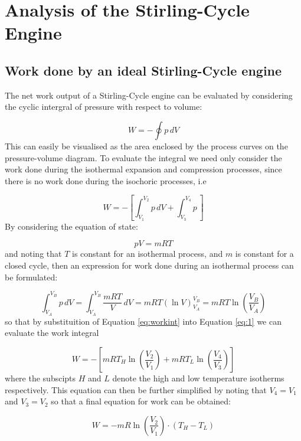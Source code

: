 \documentclass[a4paper,12pt]{article}
\date{13-10-2020}
\begin{document}
\section{Analysis of the Stirling-Cycle Engine}
\subsection{Work done by an ideal Stirling-Cycle engine}
The net work output of a Stirling-Cycle engine can be evaluated by considering the cyclic intergral of pressure with respect to volume:

\begin{equation}
    W = -\oint p \, dV
\end{equation}
This can easily be visualised as the area enclosed by the process curves on the pressure-volume diagram. \newline
To evaluate the integral we need only consider the work done during the isothermal expansion and compression processes, since there is no work done during the isochoric processes, i.e

\begin{equation}
    W = - \left[ \int_{V_1}^{V_2} p \, dV + \int_{V_3}^{V_4} p \,\right]
    \label{eq:1}
\end{equation}
By considering the equation of state:

\begin{equation}
    pV=mRT
\end{equation}
and noting that \(T\) is constant for an isothermal process, and \(m\) is constant for a closed cycle, then an expression for work done during an isothermal process can be formulated:

\begin{equation}
    \int_{V_A}^{V_B} p \, dV = \int_{V_A}^{V_B} \frac{mRT}{V} \, dV = mRT(\ln V)_{V_A}^{V_B} = mRT \ln\left(\frac{V_B}{V_A}\right)
    \label{eq:workint}
\end{equation}
so that by substituition of Equation \eqref{eq:workint} into Equation \eqref{eq:1} we can evaluate the work integral

\begin{equation}
    W = -\left[mRT_H\ln\left(\frac{V_2}{V_1}\right)+mRT_L\ln\left(\frac{V_4}{V_3}\right)\right]
\end{equation}
where the subscipts \(H\) and \(L\) denote the high and low temperature isotherms respectively. \newline
This equation can then be further simplified by noting that \(V_4 = V_1\) and \(V_3 = V_2\) so that a final equation for work can be obtained:

\begin{equation}
    W = -mR\ln\left(\frac{V_2}{V_1}\right)\cdot (T_H - T_L)
\end{equation}


 
\end{document}
